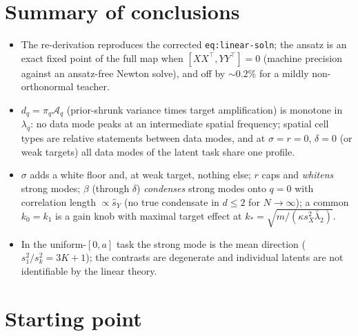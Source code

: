 \documentclass[11pt,a4paper]{article}
\newcommand{\amp}{\mathcal A}
\theoremstyle{remark}
\begin{document}
\section*{Summary of conclusions}
\begin{itemize}[nosep]
  \item The re-derivation reproduces the corrected \texttt{eq:linear-soln}; the ansatz is an exact fixed point of the full map when $[XX^\top, YY^\top] = 0$ (machine precision against an ansatz-free Newton solve), and off by $\sim0.2\%$ for a mildly non-orthonormal teacher.
  \item $d_q = \pi_q\amp_q$ (prior-shrunk variance times target amplification) is monotone in $\lambda_q$: no data mode peaks at an intermediate spatial frequency; spatial cell types are relative statements between data modes, and at $\sigma = r = 0$, $\delta = 0$ (or weak targets) all data modes of the latent task share one profile.
  \item $\sigma$ adds a white floor and, at weak target, nothing else; $r$ caps and \emph{whitens} strong modes; $\beta$ (through $\delta$) \emph{condenses} strong modes onto $q = 0$ with correlation length $\propto\hat s_Y$ (no true condensate in $d\le2$ for $N\to\infty$); a common $k_0 = k_1$ is a gain knob with maximal target effect at $k_* = \sqrt{m/(\kappa s_X^2\bar\lambda_2)}$.
  \item In the uniform-$[0,a]$ task the strong mode is the mean direction ($s_1^2/s_k^2 = 3K+1$); the contrasts are degenerate and individual latents are not identifiable by the linear theory.
\end{itemize}

\tableofcontents

\section{Starting point}
\label{sec:start}
\end{document}
